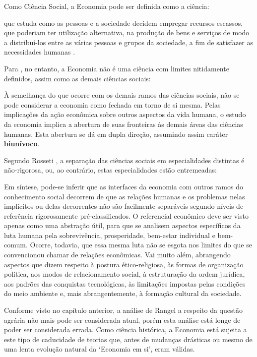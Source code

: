 \documentclass[
	12pt,				%
	oneside,			%
	a4paper,			%
	chapter=TITLE,		%
	section=TITLE,		%
	english,			%
	brazil				%
	]{abntex2}
\begin{document}
\begin{refsection}
Como Ciência Social, a Economia pode ser definida como a ciência:
\begin{citacao}
que estuda como as pessoas e a sociedade decidem empregar recursos escassos, que
poderiam ter utilização alternativa, na produção de bens e serviços de modo a
distribuí-los  entre as várias pessoas e grupos da sociedade, a fim de
satisfazer as necessidades humanas
\cite[p.~5]{passosnogami}.
\end{citacao}
Para \textcite[p.~31]{rossetti}, no entanto, a Economia não é uma ciência com
limites nitidamente definidos, assim como as demais ciências sociais:
\begin{citacao}
À semelhança do que ocorre com os demais ramos das ciências sociais, não se pode
considerar a economia como fechada em torno de si mesma. Pelas implicações da
ação econômica sobre outros aspectos da vida humana, o estudo da economia
implica a abertura de suas fronteiras às demais áreas das ciências humanas. Esta
abertura se dá em dupla direção, assumindo assim caráter \textbf{biunívoco}.
\end{citacao}
Segundo Rosseti \autocite*[32]{rossetti}, a separação das ciências sociais em
especialidades distintas é não-rigorosa, ou, ao contrário, estas especialidades
estão entremeadas:
\begin{citacao}
Em síntese, pode-se inferir que as interfaces da economia com outros ramos do
conhecimento social decorrem de que as relações humanas e os problemas nelas
implícitos ou delas decorrentes não são facilmente separáveis segundo níveis de
referência rigorosamente pré-classificados. O referencial econômico deve ser
visto apenas como uma abstração útil, para que se analisem aspectos específicos
da luta humana pela sobrevivência, prosperidade, bem-estar individual e
bem-comum. Ocorre, todavia, que essa mesma luta não se esgota nos limites do que
se convencionou chamar de relações econômicas. Vai muito além, abrangendo
aspectos que dizem respeito à postura ético-religiosa, às formas de organização
política, aos modos de relacionamento social, à estruturação da ordem jurídica,
aos padrões das conquistas tecnológicas, às limitações impostas pelas condições
do meio ambiente e, mais abrangentemente, à formação cultural da sociedade.
\end{citacao}
Conforme visto no capítulo anterior, a análise de Rangel a respeito da questão
agrária não mais pode ser considerada atual, porém esta análise está longe de
poder ser considerada errada. Como ciência histórica, a Economia está sujeita a
este tipo de caducidade de teorias que, antes de mudanças drásticas ou mesmo de
uma lenta evolução natural da `Economia em si', eram válidas.


\end{refsection}
\end{document}

